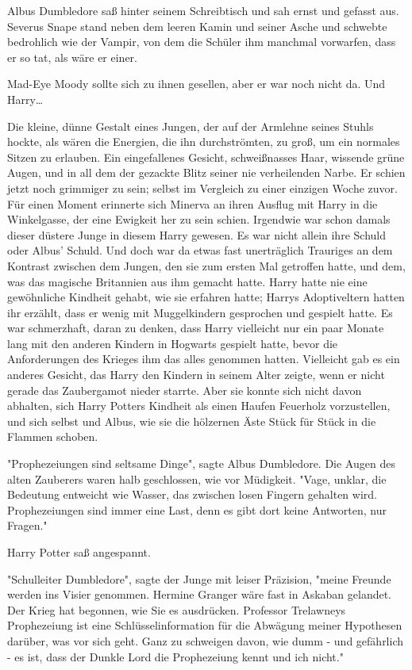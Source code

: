 {Albus Dumbledore saß hinter seinem Schreibtisch und sah ernst und gefasst aus. Severus Snape stand neben dem leeren Kamin und seiner Asche und schwebte bedrohlich wie der Vampir, von dem die Schüler ihm manchmal vorwarfen, dass er so tat, als wäre er einer.

Mad-Eye Moody sollte sich zu ihnen gesellen, aber er war noch nicht da. Und Harry…

Die kleine, dünne Gestalt eines Jungen, der auf der Armlehne seines Stuhls hockte, als wären die Energien, die ihn durchströmten, zu groß, um ein normales Sitzen zu erlauben. Ein eingefallenes Gesicht, schweißnasses Haar, wissende grüne Augen, und in all dem der gezackte Blitz seiner nie verheilenden Narbe. Er schien jetzt noch grimmiger zu sein; selbst im Vergleich zu einer einzigen Woche zuvor. Für einen Moment erinnerte sich Minerva an ihren Ausflug mit Harry in die Winkelgasse, der eine Ewigkeit her zu sein schien. Irgendwie war schon damals dieser düstere Junge in diesem Harry gewesen. Es war nicht allein ihre Schuld oder Albus' Schuld. Und doch war da etwas fast unerträglich Trauriges an dem Kontrast zwischen dem Jungen, den sie zum ersten Mal getroffen hatte, und dem, was das magische Britannien aus ihm gemacht hatte. Harry hatte nie eine gewöhnliche Kindheit gehabt, wie sie erfahren hatte; Harrys Adoptiveltern hatten ihr erzählt, dass er wenig mit Muggelkindern gesprochen und gespielt hatte. Es war schmerzhaft, daran zu denken, dass Harry vielleicht nur ein paar Monate lang mit den anderen Kindern in Hogwarts gespielt hatte, bevor die Anforderungen des Krieges ihm das alles genommen hatten. Vielleicht gab es ein anderes Gesicht, das Harry den Kindern in seinem Alter zeigte, wenn er nicht gerade das Zaubergamot nieder starrte. Aber sie konnte sich nicht davon abhalten, sich Harry Potters Kindheit als einen Haufen Feuerholz vorzustellen, und sich selbst und Albus, wie sie die hölzernen Äste Stück für Stück in die Flammen schoben.

"Prophezeiungen sind seltsame Dinge", sagte Albus Dumbledore. Die Augen des alten Zauberers waren halb geschlossen, wie vor Müdigkeit. "Vage, unklar, die Bedeutung entweicht wie Wasser, das zwischen losen Fingern gehalten wird. Prophezeiungen sind immer eine Last, denn es gibt dort keine Antworten, nur Fragen."

Harry Potter saß angespannt.

"Schulleiter Dumbledore", sagte der Junge mit leiser Präzision, "meine Freunde werden ins Visier genommen. Hermine Granger wäre fast in Askaban gelandet. Der Krieg hat begonnen, wie Sie es ausdrücken. Professor Trelawneys Prophezeiung ist eine Schlüsselinformation für die Abwägung meiner Hypothesen darüber, was vor sich geht. Ganz zu schweigen davon, wie dumm - und gefährlich - es ist, dass der Dunkle Lord die Prophezeiung kennt und ich nicht."

}
